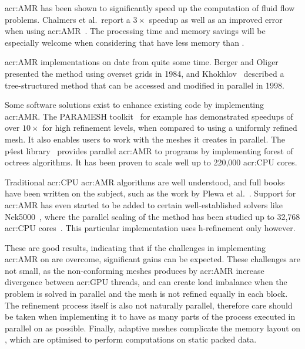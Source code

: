 \Acrshort{acr:AMR} has been shown to significantly speed up the computation of fluid flow problems.
Chalmers et al.\ report a \(3 \times \) speedup as well as an improved error when using
\acrshort{acr:AMR}~\cite{Chalmers2019}. The processing time and memory savings will be especially
welcome when considering that  have less memory than .

\Acrshort{acr:AMR} implementations on  date from quite some time. Berger and
Oliger~\cite{Berger1984} presented the method using overset grids in 1984, and
Khokhlov~\cite{Khokhlov1998} described a tree-structured method that can be accessed and modified in
parallel in 1998.

Some software solutions exist to enhance existing code by implementing \acrlong{acr:AMR}. The
PARAMESH toolkit~\cite{MacNeice2000} for example has demonstrated speedups of over \( 10 \times \)
for high refinement levels, when compared to using a uniformly refined mesh. It also enables users
to work with the meshes it creates in parallel. The p4est library~\cite{Burstedde2011} provides
parallel \acrshort{acr:AMR} to programs by implementing forest of octrees algorithms. It has been
proven to scale well up to 220,000 \acrshort{acr:CPU} cores.

Traditional \acrshort{acr:CPU} \acrshort{acr:AMR} algorithms are well understood, and full books
have been written on the subject, such as the work by Plewa et al.~\cite{Plewa2005}. Support for
\acrshort{acr:AMR} has even started to be added to certain well-established solvers like
Nek5000~\cite{Offermans2019}, where the parallel scaling of the method has been studied up to 32,768
\acrshort{acr:CPU} cores~\cite{Peplinski2016}. This particular implementation uses h-refinement
only however.

These are good results, indicating that if the challenges in implementing \acrshort{acr:AMR} on
 are overcome, significant gains can be expected. These challenges are not
small, as the non-conforming meshes produces by \acrshort{acr:AMR} increase divergence between
\acrshort{acr:GPU} threads, and can create load imbalance when the problem is solved in parallel and
the mesh is not refined equally in each block. The refinement process itself is also not naturally
parallel, therefore care should be taken when implementing it to have as many parts of the process
executed in parallel on  as possible. Finally, adaptive meshes complicate the
memory layout on , which are optimised to perform computations on static packed
data.

